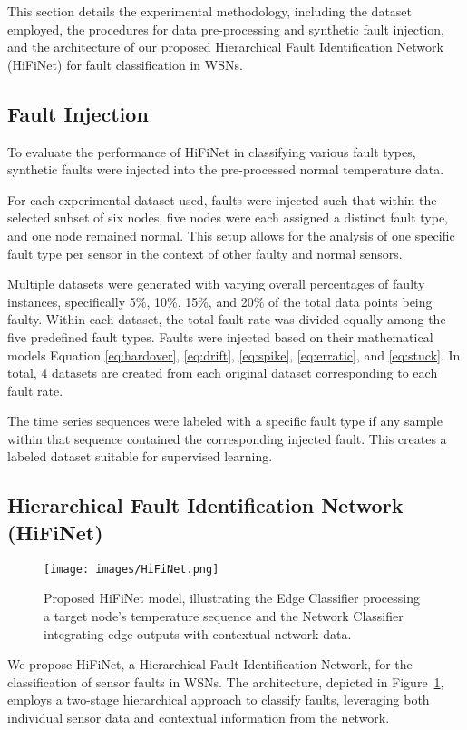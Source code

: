 This section details the experimental methodology, including the dataset employed, the procedures for data pre-processing and synthetic fault injection, and the architecture of our proposed Hierarchical Fault Identification Network (HiFiNet) for fault classification in WSNs.

\subsection{Fault Injection}
To evaluate the performance of HiFiNet in classifying various fault types, synthetic faults were injected into the pre-processed normal temperature data. 

For each experimental dataset used, faults were injected such that within the selected subset of six nodes, five nodes were each assigned a distinct fault type, and one node remained normal. This setup allows for the analysis of one specific fault type per sensor in the context of other faulty and normal sensors.

Multiple datasets were generated with varying overall percentages of faulty instances, specifically 5\%, 10\%, 15\%, and 20\% of the total data points being faulty. Within each dataset, the total fault rate was divided equally among the five predefined fault types. Faults were injected based on their mathematical models Equation \ref{eq:hardover}, \ref{eq:drift}, \ref{eq:spike}, \ref{eq:erratic}, and \ref{eq:stuck}. In total, 4 datasets are created from each original dataset corresponding to each fault rate.

The time series sequences were labeled with a specific fault type if any sample within that sequence contained the corresponding injected fault. This creates a labeled dataset suitable for supervised learning.

\subsection{Hierarchical Fault Identification Network (HiFiNet)}
\begin{figure}
  \centering
  \texttt{[image: images/HiFiNet.png]}
  \caption{Proposed HiFiNet model, illustrating the Edge Classifier processing a target node's temperature sequence and the Network Classifier integrating edge outputs with contextual network data.}
  \label{fig:hifinet}
\end{figure}
We propose HiFiNet, a Hierarchical Fault Identification Network, for the classification of sensor faults in WSNs. The architecture, depicted in Figure~\ref{fig:hifinet}, employs a two-stage hierarchical approach to classify faults, leveraging both individual sensor data and contextual information from the network.

